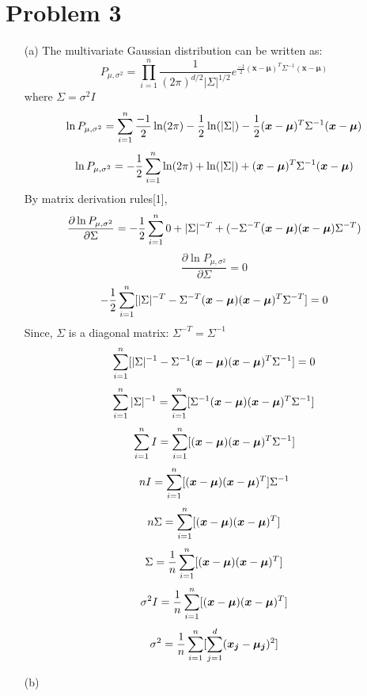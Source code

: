 \documentclass[fleqn]{article}
\begin{document}
\section{Problem 3}{}
\begin{itemize}
        \item[(a)]
		The multivariate Gaussian distribution can be written as:
		\[
			P_{\mu, \sigma^2} = \prod_{i = 1}^{n} \frac{1}{(2 \pi)^{d/2} |\Sigma|^{1/2}} e^{\frac{-1}{2} (\bm{x} - \bm{\mu})^T \Sigma^{-1} (\bm{x} - \bm{\mu}) }
		\]
		where $\Sigma = \sigma^2 I$
		\[
			\ln P_{\mu, \sigma^2} = 
			\smashoperator{\sum_{i = 1}^{n}} 
				\frac{-1}{2} \ln(2\pi) 
				- \frac{1}{2} \ln(|\Sigma|) 
				- \frac{1}{2} (\bm{x} - \bm{\mu})^T \Sigma^{-1} (\bm{x} - \bm{\mu})
		\]
		\[
			\ln P_{\mu, \sigma^2} = 
			- \frac{1}{2} \smashoperator{\sum_{i = 1}^{n}} 
				\ln(2\pi) 
				+ \ln(|\Sigma|) 
				+ (\bm{x} - \bm{\mu})^T \Sigma^{-1} (\bm{x} - \bm{\mu})
		\]
		By matrix derivation rules[1],
		\[
			\frac{\partial \ln P_{\mu, \sigma^2}}{\partial \Sigma} = 
			- \frac{1}{2} \smashoperator{\sum_{i = 1}^{n}} 
				0 + |\Sigma|^{-T} 
				+ (- \Sigma^{-T}(\bm{x} - \bm{\mu}) (\bm{x} - \bm{\mu}) \Sigma^{-T})
		\]
		\[
			\frac{\partial \ln P_{\mu, \sigma^2}}{\partial \Sigma} = 0
		\]
		\[
			- \frac{1}{2} \smashoperator{\sum_{i = 1}^{n}} 
			[ |\Sigma|^{-T} 
			- \Sigma^{-T}(\bm{x} - \bm{\mu}) (\bm{x} - \bm{\mu})^T \Sigma^{-T} ]
			= 0
		\]
		Since, $\Sigma$ is a diagonal matrix: $\Sigma^{-T} = \Sigma^{-1}$
		\[
			\smashoperator{\sum_{i = 1}^{n}} 
			[ |\Sigma|^{-1} 
			- \Sigma^{-1}(\bm{x} - \bm{\mu}) (\bm{x} - \bm{\mu})^T \Sigma^{-1} ]
			= 0
		\]
		\[
			\smashoperator{\sum_{i = 1}^{n}} |\Sigma|^{-1} =
			\smashoperator{\sum_{i = 1}^{n}} 
			[ \Sigma^{-1}(\bm{x} - \bm{\mu}) (\bm{x} - \bm{\mu})^T \Sigma^{-1} ]
		\]
		\[
			\smashoperator{\sum_{i = 1}^{n}} I =
			\smashoperator{\sum_{i = 1}^{n}} 
			[ (\bm{x} - \bm{\mu}) (\bm{x} - \bm{\mu})^T \Sigma^{-1} ]
		\]
		\[
			nI =
			\smashoperator{\sum_{i = 1}^{n}} [ (\bm{x} - \bm{\mu}) (\bm{x} - \bm{\mu})^T] \Sigma^{-1}
		\]
		\[
			n\Sigma =
			\smashoperator{\sum_{i = 1}^{n}} [ (\bm{x} - \bm{\mu}) (\bm{x} - \bm{\mu})^T ]
		\]
		\[
			\Sigma = \frac{1}{n} \smashoperator{\sum_{i = 1}^{n}} [ (\bm{x} - \bm{\mu}) (\bm{x} - \bm{\mu})^T ]
		\]
		\[
			\sigma^2 I = \frac{1}{n} \smashoperator{\sum_{i = 1}^{n}} [ (\bm{x} - \bm{\mu}) (\bm{x} - \bm{\mu})^T ]
		\]
 		\[
			\sigma^2 = \frac{1}{n} \smashoperator{\sum_{i = 1}^{n}} [\smashoperator{\sum_{j = 1}^{d}} (\bm{x_j} - \bm{\mu_j})^2]
		\]
        \item[(b)]
\end{itemize}
\end{document}
